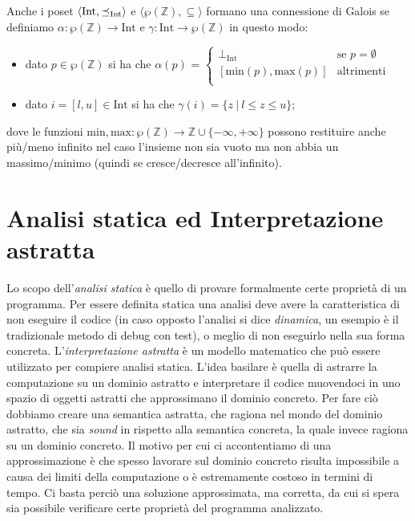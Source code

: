 \begin{example}
Anche i poset \(\langle \textrm{Int}, \preceq_{\textrm{Int}}\rangle\) e \(\langle\wp(\mathbb{Z}), \subseteq\rangle\) formano una connessione di Galois se definiamo \(\alpha:\wp(\mathbb{Z})\rightarrow\textrm{Int}\) e \(\gamma:\textrm{Int}\rightarrow\wp(\mathbb{Z})\) in questo modo:
\begin{itemize}
\item dato \(p\in\wp(\mathbb{Z})\) si ha che \(\alpha(p)\) = 
$
\begin{cases}
\perp_{\textrm{Int}} & \textrm{se } p=\emptyset\\
[\textrm{min}(p), \textrm{max}(p)] & \textrm{altrimenti}\\
\end{cases}
$
    \item dato \(i=[l, u]\in\textrm{Int}\) si ha che \(\gamma(i)=\{z\ |\ l\leq z \leq u\}\);
\end{itemize}
dove le funzioni \(\textrm{min},\textrm{max}:\wp(\mathbb{Z})\rightarrow\mathbb{Z}\cup\{-\infty, +\infty\}\) possono restituire anche più/meno infinito nel caso l'insieme non sia vuoto ma non abbia un massimo/minimo (quindi se cresce/decresce all'infinito).
\end{example}

\section{Analisi statica ed Interpretazione astratta}

Lo scopo dell'\textit{analisi statica} è quello di provare formalmente certe proprietà di un programma. Per essere definita statica una analisi deve avere la caratteristica di non eseguire il codice (in caso opposto l'analisi si dice \textit{dinamica}, un esempio è il tradizionale metodo di debug con test), o meglio di non eseguirlo nella sua forma concreta. L'\textit{interpretazione astratta} è un modello matematico che può essere utilizzato per compiere analisi statica. L'idea basilare è quella di astrarre la computazione su un dominio astratto e interpretare il codice muovendoci in uno spazio di oggetti astratti che approssimano il dominio concreto. Per fare ciò dobbiamo creare una semantica astratta, che ragiona nel mondo del dominio astratto, che sia \textit{sound} in rispetto alla semantica concreta, la quale invece ragiona su un dominio concreto. Il motivo per cui ci accontentiamo di una approssimazione è che spesso lavorare sul dominio concreto risulta impossibile a causa dei limiti della computazione o è estremamente costoso in termini di tempo. Ci basta perciò una soluzione approssimata, ma corretta, da cui si spera sia possibile verificare certe proprietà del programma analizzato.

